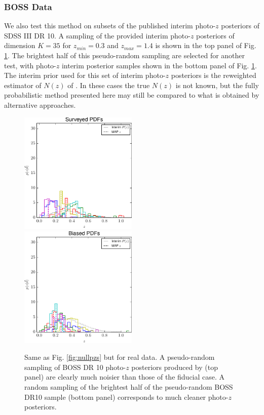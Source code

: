 \documentclass[preprint]{aastex}
\begin{document}
\subsubsection{BOSS Data}
\label{sec:data}

We also test this method on subsets of the published interim photo-$z$ 
posteriors of SDSS III DR 10.  A sampling of the provided interim photo-$z$ 
posteriors of dimension $K=35$ for $z_{min}=0.3$ and $z_{max}=1.4$ is shown in 
the top panel of Fig. \ref{fig:datapzs}.  The brightest half of this 
pseudo-random sampling are selected for another test, with photo-$z$ interim 
posterior samples shown in the bottom panel of Fig. \ref{fig:datapzs}.  The 
interim prior used for this set of interim photo-$z$ posteriors is the 
reweighted estimator of $N(z)$ of \citet{Sheldon2012}.  In these cases the true 
$N(z)$ is not known, but the fully probabilistic method presented here may 
still be compared to what is obtained by alternative approaches.

\begin{figure}
\includegraphics[width=0.5\textwidth]{figs/boss/samplepzs.pdf}\\
\includegraphics[width=0.5\textwidth]{figs/bias/samplepzs.pdf}
\caption{Same as Fig. \ref{fig:nullpzs} but for real data.  A pseudo-random 
sampling of BOSS DR 10 photo-$z$ posteriors produced by \citet{Sheldon2012} 
(top panel) are clearly much noisier than those of the fiducial case.  A random 
sampling of the brightest half of the pseudo-random BOSS DR10 sample (bottom 
panel) corresponds to much cleaner photo-$z$ posteriors.}
\label{fig:datapzs}
\end{figure}
\end{document}

